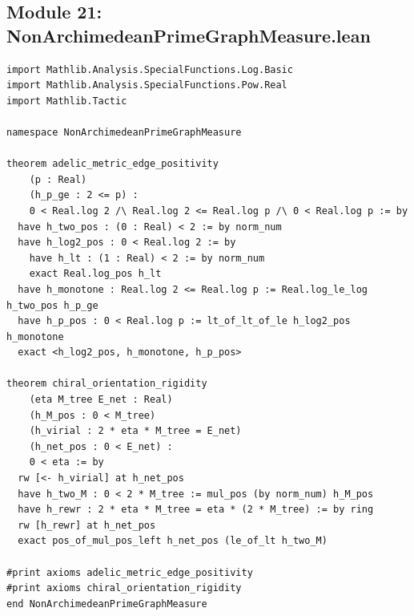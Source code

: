 \documentclass[11pt,a4paper]{article}
\begin{document}
\subsection{Module 21: NonArchimedeanPrimeGraphMeasure.lean}
\begin{lstlisting}[language=Lean4]
import Mathlib.Analysis.SpecialFunctions.Log.Basic
import Mathlib.Analysis.SpecialFunctions.Pow.Real
import Mathlib.Tactic

namespace NonArchimedeanPrimeGraphMeasure

theorem adelic_metric_edge_positivity
    (p : Real)
    (h_p_ge : 2 <= p) :
    0 < Real.log 2 /\ Real.log 2 <= Real.log p /\ 0 < Real.log p := by
  have h_two_pos : (0 : Real) < 2 := by norm_num
  have h_log2_pos : 0 < Real.log 2 := by
    have h_lt : (1 : Real) < 2 := by norm_num
    exact Real.log_pos h_lt
  have h_monotone : Real.log 2 <= Real.log p := Real.log_le_log h_two_pos h_p_ge
  have h_p_pos : 0 < Real.log p := lt_of_lt_of_le h_log2_pos h_monotone
  exact <h_log2_pos, h_monotone, h_p_pos>

theorem chiral_orientation_rigidity
    (eta M_tree E_net : Real)
    (h_M_pos : 0 < M_tree)
    (h_virial : 2 * eta * M_tree = E_net)
    (h_net_pos : 0 < E_net) :
    0 < eta := by
  rw [<- h_virial] at h_net_pos
  have h_two_M : 0 < 2 * M_tree := mul_pos (by norm_num) h_M_pos
  have h_rewr : 2 * eta * M_tree = eta * (2 * M_tree) := by ring
  rw [h_rewr] at h_net_pos
  exact pos_of_mul_pos_left h_net_pos (le_of_lt h_two_M)

#print axioms adelic_metric_edge_positivity
#print axioms chiral_orientation_rigidity
end NonArchimedeanPrimeGraphMeasure
\end{lstlisting}
\end{document}
